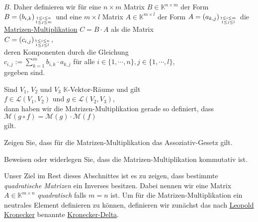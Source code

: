 $B$.  Daher definieren wir f\"{u}r eine 
$n \times m$ Matrix $B \in \mathbb{K}^{n \times m}$ der Form $B = (b_{i,k})_{1\leq i \leq n \atop 1 \leq j \leq m}$ und eine $m \times l$ Matrix
$A \in \mathbb{K}^{m \times l}$ der Form $A = (a_{k,j})_{1\leq i \leq m \atop 1 \leq j \leq l}$ die
\href{https://de.wikipedia.org/wiki/Matrizenmultiplikation}{Matrizen-Multiplikation} $C= B \cdot A$ als die
Matrix
\\[0.2cm]
\hspace*{1.3cm}
$C = (c_{i,j})_{1\leq i \leq n \atop 1 \leq j \leq l}$, 
\\[0.2cm]
deren Komponenten durch die Gleichung
\\[0.2cm]
\hspace*{1.3cm}
$c_{i,j} := \sum\limits_{k=1}^m b_{i,k} \cdot a_{k,j}$ \quad f\"{u}r alle $i \in \{1,\cdots,n\}, j \in\{1,\cdots,l\}$,
\\[0.2cm]
gegeben sind.

\remark
Sind $V_1$, $V_2$ und $V_3$ $\mathbb{K}$-Vektor-R\"{a}ume und gilt
\\[0.2cm]
\hspace*{1.3cm}
 $f \in \mathcal{L}(V_1, V_2)$ und $g \in \mathcal{L}(V_2, V_3)$,
\\[0.2cm]
dann haben wir die Matrizen-Multiplikation gerade so definiert, dass
\\[0.2cm]
\hspace*{1.3cm}
$\mathcal{M}(g \circ f) = \mathcal{M}(g) \cdot \mathcal{M}(f)$
\\[0.2cm]
gilt.  \eoxs

\exerciseStar
Zeigen Sie, dass f\"{u}r die Matrizen-Multiplikation das Assoziativ-Gesetz gilt.
\eoxs

\exercise
Beweisen oder widerlegen Sie, dass die Matrizen-Multiplikation kommutativ ist.
\eox

Unser Ziel im Rest dieses Abschnittes ist es zu zeigen, dass bestimmte \emph{\color{blue}quadratische Matrizen} ein
Inverses besitzen.  Dabei nennen wir eine Matrix $A \in \mathbb{K}^{m \times n}$ {\emph{\color{blue}quadratisch}}
falls $m = n$ ist.  Um f\"{u}r die Matrizen-Multiplikation ein neutrales Element definieren zu k\"{o}nnen,
definieren wir zun\"{a}chst das nach 
\href{http://de.wikipedia.org/wiki/Leopold_Kronecker}{Leopold Kronecker} benannte
\href{https://de.wikipedia.org/wiki/Kronecker-Delta}{Kronecker-Delta}. 


